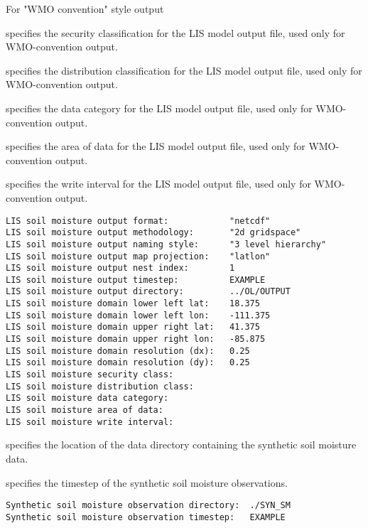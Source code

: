  For "WMO convention" style output

 specifies the security classification for the LIS model output file,
 used only for WMO-convention output.

 specifies the distribution classification for the LIS model output file,
 used only for WMO-convention output.

 specifies the data category for the LIS model output file,
 used only for WMO-convention output.

 specifies the area of data for the LIS model output file,
 used only for WMO-convention output.

 specifies the write interval for the LIS model output file,
 used only for WMO-convention output.
 

 \begin{Verbatim}[frame=single]
LIS soil moisture output format:            "netcdf"
LIS soil moisture output methodology:       "2d gridspace"
LIS soil moisture output naming style:      "3 level hierarchy"
LIS soil moisture output map projection:    "latlon"
LIS soil moisture output nest index:        1
LIS soil moisture output timestep:          EXAMPLE
LIS soil moisture output directory:         ../OL/OUTPUT
LIS soil moisture domain lower left lat:    18.375
LIS soil moisture domain lower left lon:    -111.375
LIS soil moisture domain upper right lat:   41.375
LIS soil moisture domain upper right lon:   -85.875
LIS soil moisture domain resolution (dx):   0.25
LIS soil moisture domain resolution (dy):   0.25
LIS soil moisture security class:
LIS soil moisture distribution class:
LIS soil moisture data category:
LIS soil moisture area of data:
LIS soil moisture write interval:
 \end{Verbatim}

 
 specifies the location of the data directory containing the synthetic 
 soil moisture data.

  specifies
 the timestep of the synthetic soil moisture observations.
 

 \begin{Verbatim}[frame=single]
Synthetic soil moisture observation directory:  ./SYN_SM
Synthetic soil moisture observation timestep:   EXAMPLE
 \end{Verbatim}

